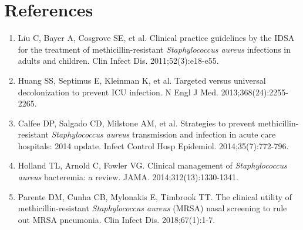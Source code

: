 \section*{References}
\begin{enumerate}
  \item Liu C, Bayer A, Cosgrove SE, et al. Clinical practice guidelines by the IDSA for the treatment of methicillin-resistant \textit{Staphylococcus aureus} infections in adults and children. Clin Infect Dis. 2011;52(3):e18-e55.
  \item Huang SS, Septimus E, Kleinman K, et al. Targeted versus universal decolonization to prevent ICU infection. N Engl J Med. 2013;368(24):2255-2265.
  \item Calfee DP, Salgado CD, Milstone AM, et al. Strategies to prevent methicillin-resistant \textit{Staphylococcus aureus} transmission and infection in acute care hospitals: 2014 update. Infect Control Hosp Epidemiol. 2014;35(7):772-796.
  \item Holland TL, Arnold C, Fowler VG. Clinical management of \textit{Staphylococcus aureus} bacteremia: a review. JAMA. 2014;312(13):1330-1341.
  \item Parente DM, Cunha CB, Mylonakis E, Timbrook TT. The clinical utility of methicillin-resistant \textit{Staphylococcus aureus} (MRSA) nasal screening to rule out MRSA pneumonia. Clin Infect Dis. 2018;67(1):1-7.
\end{enumerate}

\clearpage
